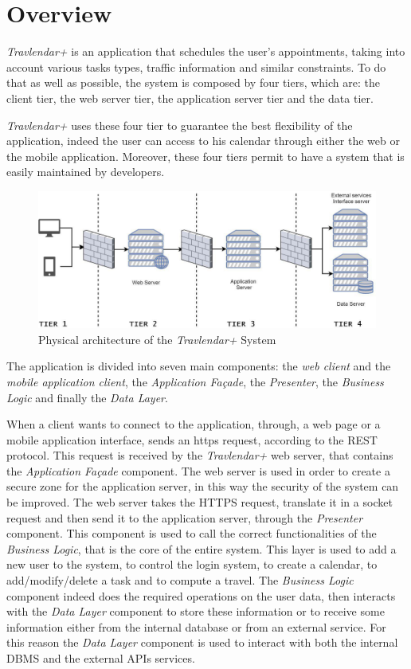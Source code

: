 \section{Overview}
\emph{Travlendar+} is an application that schedules the user's appointments, taking into account various tasks types, traffic information and similar constraints. To do that as well as possible, the system is composed by four tiers, which are: the client tier, the web server tier, the application server tier and the data tier.

\emph{Travlendar+} uses these four tier to guarantee the best flexibility of the application, indeed the user can access to his calendar through either the web or the mobile application. Moreover, these four tiers permit to have a system that is easily maintained by developers.

\begin{figure}[H]
    \centering
    \includegraphics[scale=0.7]{Pictures/OverviewPictures/physical.jpg}
    \caption{Physical architecture of the \emph{Travlendar+} System}
\end{figure}
The application is divided into seven main components: the \emph{web client} and the \emph{mobile application client}, the \emph{Application Façade}, the \emph{Presenter}, the \emph{Business Logic} and finally the \emph{Data Layer}.

When a client wants to connect to the application, through, a web page or a mobile application interface, sends an https request, according to the REST protocol. This request is received by the \emph{Travlendar+} web server, that contains the \emph{Application Façade} component. The web server is used in order to create a secure zone for the application server, in this way the security of the system can be improved. The web server takes the HTTPS request, translate it in a socket request and then send it to the application server, through the \emph{Presenter} component. This component is used to call the correct functionalities of the \emph{Business Logic}, that is the core of the entire system. This layer is used to add a new user to the system, to control the login system, to create a calendar, to add/modify/delete a task and to compute a travel. The \emph{Business Logic} component indeed does the required operations on the user data, then interacts with the \emph{Data Layer} component to store these information or to receive some information either from the internal database or from an external service. For this reason the \emph{Data Layer} component is used to interact with both the internal DBMS and the external APIs services.

